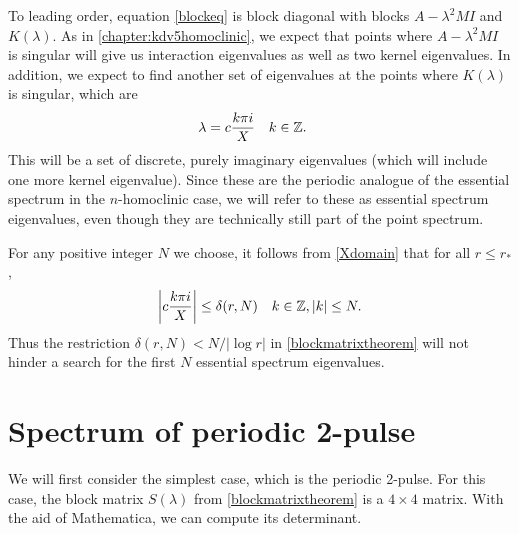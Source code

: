 \documentclass[thesis.tex]{subfiles}
\begin{document}
To leading order, equation \cref{blockeq} is block diagonal with blocks $A - \lambda^2 MI$ and $K(\lambda)$. As in \cref{chapter:kdv5homoclinic}, we expect that points where $A - \lambda^2 MI$ is singular will give us interaction eigenvalues as well as two kernel eigenvalues. In addition, we expect to find another set of eigenvalues at the points where $K(\lambda)$ is singular, which are
\begin{align*}
\lambda &= c\frac{k \pi i}{X} && k \in \mathbb{Z}.
\end{align*}
This will be a set of discrete, purely imaginary eigenvalues (which will include one more kernel eigenvalue). Since these are the periodic analogue of the essential spectrum in the $n$-homoclinic case, we will refer to these as essential spectrum eigenvalues, even though they are technically still part of the point spectrum. 

\begin{remark}
For any positive integer $N$ we choose, it follows from \cref{Xdomain} that for all $r \leq r_*$,
\begin{align*}
\left| c\frac{k \pi i}{X} \right| \leq \delta(r,N) && k \in \mathbb{Z}, |k|\leq N.
\end{align*}
Thus the restriction $\delta(r,N) < N/|\log r|$ in \cref{blockmatrixtheorem} will not hinder a search for the first $N$ essential spectrum eigenvalues.
\end{remark}

\section{Spectrum of periodic 2-pulse}\label{sec:per2peig}

We will first consider the simplest case, which is the periodic 2-pulse. For this case, the block matrix  $S(\lambda)$ from \cref{blockmatrixtheorem} is a $4\times4$ matrix. With the aid of Mathematica, we can compute its determinant.
\end{document}
